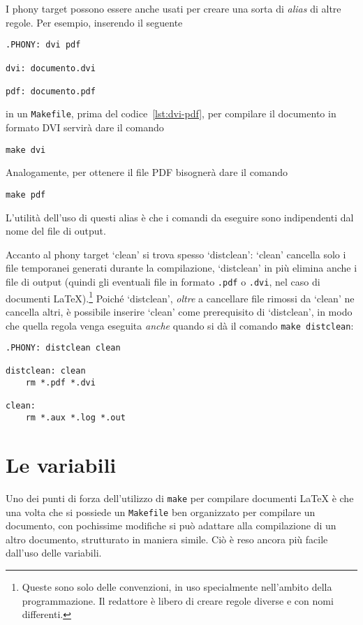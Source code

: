 I phony target possono essere anche usati per creare una sorta di \emph{alias}
di altre regole.  Per esempio, inserendo il seguente
\begin{lstlisting}[caption=I prerequisiti della regola dell'obiettivo \texttt{.PHONY}
sono i nomi dei phony target che vengono successivamente specificati,label=lst:phony]
.PHONY: dvi pdf

dvi: documento.dvi

pdf: documento.pdf
\end{lstlisting}
in un \verb|Makefile|, prima del codice~\ref{lst:dvi-pdf}, per compilare il
documento in formato \textsc{DVI} servirà dare il comando
\begin{verbatim}
make dvi
\end{verbatim}
Analogamente, per ottenere il file \textsc{PDF} bisognerà dare il comando
\begin{verbatim}
make pdf
\end{verbatim}
L'utilità dell'uso di questi alias è che i comandi da eseguire sono indipendenti
dal nome del file di output.

Accanto al phony target `clean' si trova spesso `distclean': `clean' cancella
solo i file temporanei generati durante la compilazione, `distclean' in più
elimina anche i file di output (quindi gli eventuali file in formato \verb|.pdf|
o \verb|.dvi|, nel caso di documenti
\LaTeX).\footnote{Queste sono solo delle convenzioni, in uso specialmente
  nell'ambito della programmazione. Il redattore è libero di creare regole
  diverse e con nomi differenti.}
Poiché `distclean', \emph{oltre} a cancellare file rimossi da `clean' ne
cancella altri, è possibile inserire `clean' come prerequisito di `distclean',
in modo che quella regola venga eseguita \emph{anche} quando si dà il comando
\verb|make distclean|:
\begin{lstlisting}[caption={Phony target `distclean' e `clean'},label=lst:distclean]
.PHONY: distclean clean

distclean: clean
	rm *.pdf *.dvi

clean:
	rm *.aux *.log *.out
\end{lstlisting}


\section{Le variabili}
\label{sec:variabili}

Uno dei punti di forza dell'utilizzo di \verb|make| per compilare documenti
\LaTeX{}
è che una volta che si possiede un \verb|Makefile| ben organizzato per compilare
un documento, con pochissime modifiche si può adattare alla compilazione di un
altro documento, strutturato in maniera simile.  Ciò è reso ancora più facile
dall'uso delle variabili.

